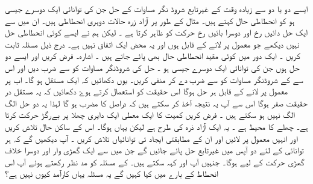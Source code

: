  ایسے دو یا دو سے زیادہ وقت کے غیرتابع شروڈ نگر مساوات کے حل جن کی توانائی  ایک دوسرے جیسی ہو کو انحطاطی حال کہتے ہیں۔ مثال کے طور پر آزاد زرہ حالات دوہری انحطاطی ہیں۔  ان میں سے ایک حل دائیں رخ اور دوسرا بائیں رخ حرکت کو ظاہر کرتا ہے ۔  لیکن ہم نے ایسے کوئی انحطاطی حل نہیں دیکھے جو معمول پر لانے کے قابل ہوں اور یہ محض ایک اتفاق نہیں ہے۔ 
 درج ذیل مسئلہ ثابت کریں ۔
ایک دور میں کوئی مقید  انحطاطی حال بھی پائے جاتے ہیں ۔ 
اشارہ۔ فرض کریں
  اور  ایسے دو حل ہوں جن کی توانائی  ایک دوسرے جیسی ہو ۔ 
حل  کی شروڈنگر  مساوات کو  سے  ضرب دیں اور اس سے کے شروڈنگر مساوات کو  سے ضرب دے کر منفی کریں۔  یوں دکھائیں کہ  ایک مستقل ہو گا۔
 اب پر معمول پر لانے کے قابل ہر حل ہوگا اس حقیقت کو استعمال کرتے ہوۓ دکھائیں کہ یہ مستقل در حقیقت صفر ہوگا اس سے آپ یہ نتیجہ آخذ کر سکتے ہیں کہ  دراصل  کا مضرب ہو گا لہذا یہ دو حل الگ الگ نہیں ہو سکتے ہیں ۔
فرض کریں کمیت   کا ایک معطی ایک دایری چھلا پر بےرگڑ حرکت کرتا ہے۔ چھلے کا محیط  ہے ۔ یہ ایک آزاد ذرہ کی طرح ہے لیکن یہاں ہوگا۔  اس کے ساکن حال تلاش کریں اور انہیں معمول پر لائیں اور ان کے مطابقتی ایجاد تی توانائیاں تلاش کریں ۔
 آپ دیکھیں گے کہ ہر توانائی کے لئے دو آپس میں غیرتابع حل پائے جائیں گے جن میں سے ایک گھڑی وار اور دوسرا خلاف گھڑی حرکت کے لیے ہوگا۔ جنہیں آپ اور  کہہ سکتے ہیں۔
کے مسئلہ  کو مد نظر رکھتے ہوئے آپ اس انحطاط کے بارے میں کیا کہیں گے یہ مسئلہ یہاں کارآمد کیوں نہیں ہے؟  
